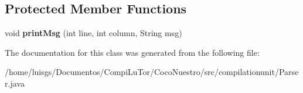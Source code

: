 \subsection*{Protected Member Functions}
\begin{DoxyCompactItemize}
\item 
\hypertarget{classcompilationunit_1_1_errors_ac5b9e08986295d6f296ec6bf95fa78c7}{
void {\bfseries printMsg} (int line, int column, String msg)}
\label{classcompilationunit_1_1_errors_ac5b9e08986295d6f296ec6bf95fa78c7}

\end{DoxyCompactItemize}


The documentation for this class was generated from the following file:\begin{DoxyCompactItemize}
\item 
/home/luisgs/Documentos/CompiLuTor/CocoNuestro/src/compilationunit/Parser.java\end{DoxyCompactItemize}
